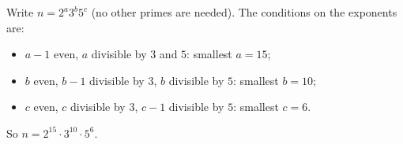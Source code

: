 Write $n=2^a3^b5^c$ (no other primes are needed). The conditions on the exponents are:
\begin{itemize}
\item $a-1$ even, $a$ divisible by $3$ and $5$: smallest $a=15$;
\item $b$ even, $b-1$ divisible by $3$, $b$ divisible by $5$: smallest $b=10$;
\item $c$ even, $c$ divisible by $3$, $c-1$ divisible by $5$: smallest $c=6$.
\end{itemize}
So $n=\boxed{2^{15}\cdot3^{10}\cdot5^6}$.
